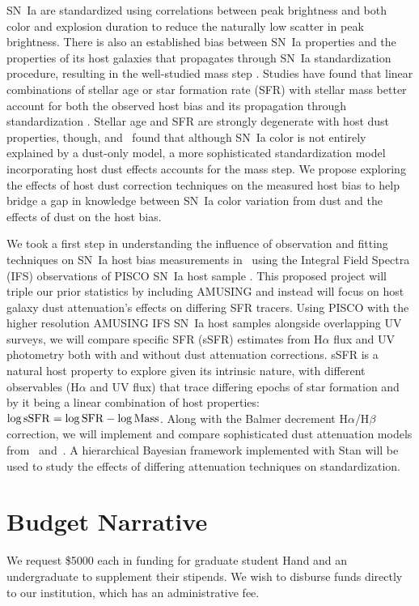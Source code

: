 \documentclass[modern]{aastex63}
\begin{document}
SN~Ia are standardized using correlations between peak brightness and both color and explosion duration to reduce the naturally low scatter in peak brightness.
There is also an established bias between SN~Ia properties and the properties of its host galaxies that propagates through SN~Ia standardization procedure, resulting in the well-studied mass step \citep{Sullivan2010}. 
Studies have found that linear combinations of stellar age or star formation rate (SFR) with stellar mass better account for both the observed host bias and its propagation through standardization \citep{Rigault2018,Rose2021}.
Stellar age and SFR are strongly degenerate with host dust properties, though, and~\cite{Brout2021} found that although SN~Ia color is not entirely explained by a dust-only model, a more sophisticated standardization model incorporating host dust effects accounts for the mass step.
We propose exploring the effects of host dust correction techniques on the measured host bias to help bridge a gap in knowledge between SN~Ia color variation from dust and the effects of dust on the host bias.

We took a first step in understanding the influence of observation and fitting techniques on SN~Ia host bias measurements in~\cite{Hand2021} using the Integral Field Spectra (IFS) observations of PISCO SN~Ia host sample \citep{Galbany2018}.  
This proposed project will triple our prior statistics by including AMUSING \citep{Galbany2016a} and instead will focus on host galaxy dust attenuation's effects on differing SFR tracers. 
Using PISCO with the higher resolution AMUSING IFS SN~Ia host samples alongside overlapping UV surveys, we will compare specific SFR (sSFR) estimates from H$\alpha$ flux and UV photometry both with and without dust attenuation corrections.
sSFR is a natural host property to explore given its intrinsic nature, with different observables (H$\alpha$ and UV flux) that trace differing epochs of star formation and by it being a linear combination of host properties: $\log{\rm sSFR} = \log{\rm SFR} - \log{\rm Mass}$.
Along with the Balmer decrement H$\alpha$/H$\beta$ correction, we will implement and compare sophisticated dust attenuation models from~\cite{Salim2018} and~\cite{Narayanan2018}.  
A hierarchical Bayesian framework implemented with Stan will be used to study the effects of differing attenuation techniques on standardization.

\section{Budget Narrative}
We request \$5000 each in funding for graduate student Hand and an undergraduate to supplement their stipends.  We wish to disburse funds directly to our institution, which has an administrative fee.



\end{document}
